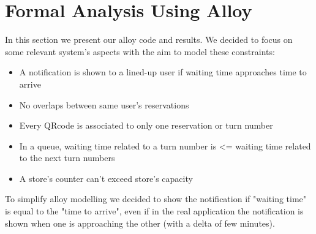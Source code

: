 \documentclass{article}
\begin{document}
\section{Formal Analysis Using Alloy}

In this section we present our alloy code and results. We decided to focus on some relevant system's aspects with the aim to model these constraints:
\begin{itemize}
\item A notification is shown to a lined-up user if waiting time approaches time to arrive
\item No overlaps between same user's reservations
\item Every QRcode is associated to only one reservation or turn number
\item In a queue, waiting time related to a turn number is <= waiting time related to the next turn numbers
\item A store's counter can't exceed store's capacity

\end{itemize}
To simplify alloy modelling we decided to show the notification if "waiting time" is equal to the "time to arrive", even if in the real application the notification is shown when one is approaching the other (with a delta of few minutes).
\end{document}

